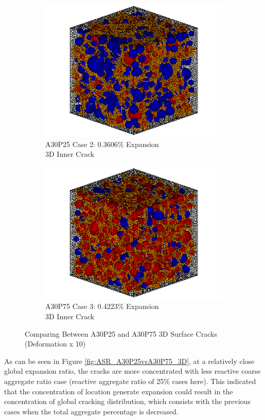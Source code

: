 \begin{figure}[ht!]
\centering

    \begin{subfigure}{.5\textwidth}
      \centering
      \includegraphics[width=.8\linewidth]{Files/exp_3D/ASR/A30P25_2_c.png}
    \caption{A30P25 Case 2: 0.3606\% Expansion \\ 3D Inner Crack}
    \end{subfigure}%
    \begin{subfigure}{.5\textwidth}
      \centering
      \includegraphics[width=.8\linewidth]{Files/exp_3D/ASR/A30P75_3_c.png}
    \caption{A30P75 Case 3: 0.4223\% Expansion\\ 3D Inner Crack}
    \end{subfigure}

  \caption{Comparing Between A30P25 and A30P75 3D Surface Cracks (Deformation x 10)}
  \label{fig:ASR_A30P25vsA30P75_3D_crack}
\end{figure}

As can be seen in Figure \ref{fig:ASR_A30P25vsA30P75_3D}, at a relatively close global expansion ratio, the cracks are more concentrated with less reactive coarse aggregate ratio case (reactive aggregate ratio of 25\% cases here). This indicated that the concentration of location generate expansion could result in the concentration of global cracking distribution, which consists with the previous cases when the total aggregate percentage is decreased.

